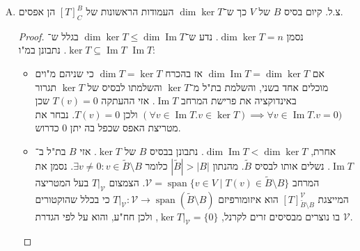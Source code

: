 \documentclass[]{article}
\newcommand\vc    {\mathcal{V}} %
\DeclareMathOperator\Img   {Im}
\DeclareMathOperator{\Sp}     {span}
\newcommand\co        {\colon}
\newcommand\tl    {\tilde}
\begin{document}
	\begin{enumerate}[A)]
		\item צ.ל. קיום בסיס $B$ של $V$ כך ש־$\dim \ker T$ העמודות הראשונות של $[T]^B_C$ הן אפסים. 
		\begin{proof}
			נסמן $\dim \ker T = n$. נדע ש־$\dim \ker T \le \dim \Img T$ בגלל ש־$\ker T \subseteq \Img T$. נתבונן במ"ו $\Img T$: 
			\begin{itemize}
				\item אם $\dim \Img T = \dim \ker T$ אז בהכרח $\dim T = \ker T$ כי שניהם מ"וים מוכלים אחד בשני, והשלמת בת"ל מ־$\ker T$ והשלמתו לבסיס של $\ker T$ תגרור באינדוקציה את פרישת המרחב $\Img T$. אזי ההעתקה $T(v) = 0$ שכן $(\forall v \in \Img T. v \in \ker T) \implies \forall v \in \Img T. v = 0)$ ולכן $T(v) = 0$. נבחר את מטריצת האפס שכפל בה יתן $0$ כדרוש. 
				\item אחרת, $\dim \Img T < \dim \ker T$. נתבונן בבסיס $B$ של $\ker T$. אזי $B$ בת"ל ב־$\Img T$. נשלים אותו לבסיס $\tl B$. מהנתון $|\tl B| > |B|$ כלומר $\exists v \neq 0 \co v \in \tl B \setminus B$. נסמן את המרחב $\vc = \Sp\{v \in V \mid T(v) \in \tl B \setminus B\}$. הצמצום $T|_{\vc}$ בעל המטריצה המייצגת $[T]^{\vc}_{\tl B \setminus B}$ הוא איזומורפיזם $T|_{\vc} \co \vc \to \Sp(\tl B \setminus B)$ כי בכלל שהוקטורים בו נוצרים מבסיסים זרים לקרנל, $\ker T|_\vc = \{0\}$, ולכן חח"ע, והוא על לפי הגדרת $\vc$. 
				

\end{itemize}
\end{proof}
\end{enumerate}
\end{document}

